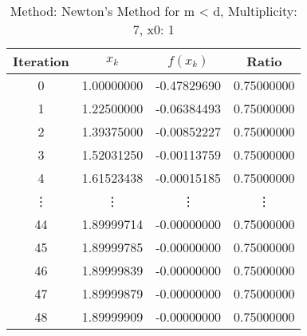 \begin{table}
\centering
\caption{Method: Newton's Method for m < d, Multiplicity: 7, x0: 1}
\label{tab:table_Newton's_Method_for_m_<_d_7_1}
\begin{tabular}{c c c c}
\toprule
Iteration &      $x_k$ &    $f(x_k)$ &      Ratio \\
\midrule
        0 & 1.00000000 & -0.47829690 & 0.75000000 \\
        1 & 1.22500000 & -0.06384493 & 0.75000000 \\
        2 & 1.39375000 & -0.00852227 & 0.75000000 \\
        3 & 1.52031250 & -0.00113759 & 0.75000000 \\
        4 & 1.61523438 & -0.00015185 & 0.75000000 \\
   \vdots &     \vdots &      \vdots &     \vdots \\
       44 & 1.89999714 & -0.00000000 & 0.75000000 \\
       45 & 1.89999785 & -0.00000000 & 0.75000000 \\
       46 & 1.89999839 & -0.00000000 & 0.75000000 \\
       47 & 1.89999879 & -0.00000000 & 0.75000000 \\
       48 & 1.89999909 & -0.00000000 & 0.75000000 \\
\bottomrule
\end{tabular}
\end{table}
